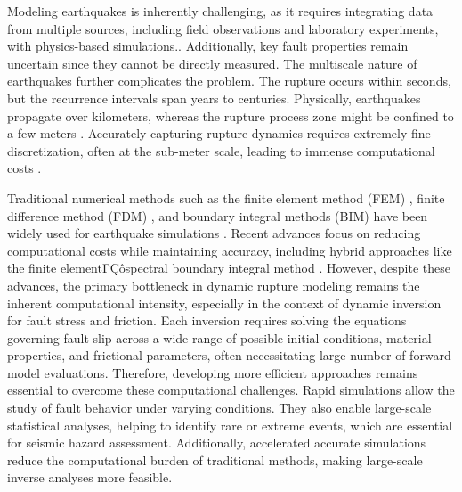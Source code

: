 \documentclass[draft]{agujournal2019}
\begin{document}
Modeling earthquakes is inherently challenging, as it requires integrating data from multiple sources, including field observations and laboratory experiments, with physics-based simulations.\cite{johnson2006frictional,Gallovic2019-method, gallovivc2019bayesian,aochi2020imaging,van2019modeling}. Additionally, key fault properties remain uncertain since they cannot be directly measured. The multiscale nature of earthquakes further complicates the problem. The rupture occurs within seconds, but the recurrence intervals span years to centuries. Physically, earthquakes propagate over kilometers, whereas the rupture process zone might be confined to a few meters \cite{lapusta2000elastodynamic,ben2008collective,chester1998ultracataclasite}. Accurately capturing rupture dynamics requires extremely fine discretization, often at the sub-meter scale, leading to immense computational costs \cite{Ulrich2019}.

Traditional numerical methods such as the finite element method (FEM) \cite{oglesby1998earthquakes,oglesby2000three,aagaard2001dynamic}, finite difference method (FDM) \cite{andrews1973numerical,day1982three,madariaga1998modeling,andrews1999test,dalguer2007staggered,moczo2007finite}, and boundary integral methods (BIM) \cite{das1980numerical,andrews1985dynamic,cochard1994dynamic,geubelle1995spectral} have been widely used for earthquake simulations . Recent advances focus on reducing computational costs while maintaining accuracy, including hybrid approaches like the finite elementΓÇôspectral boundary integral method \cite{ma2019hybrid, abdelmeguid2019novel,abdelmeguid2022modeling}. However, despite these advances, the primary bottleneck in dynamic rupture modeling remains the inherent computational intensity, especially in the context of dynamic inversion for fault stress and friction. Each inversion requires solving the equations governing fault slip across a wide range of possible initial conditions, material properties, and frictional parameters, often necessitating large number of forward model evaluations. Therefore, developing more efficient approaches remains essential to overcome these computational challenges. Rapid simulations allow the study of fault behavior under varying conditions. They also enable large-scale statistical analyses, helping to identify rare or extreme events, which are essential for seismic hazard assessment. Additionally, accelerated accurate simulations reduce the computational burden of traditional methods, making large-scale inverse analyses more feasible.
\end{document}
